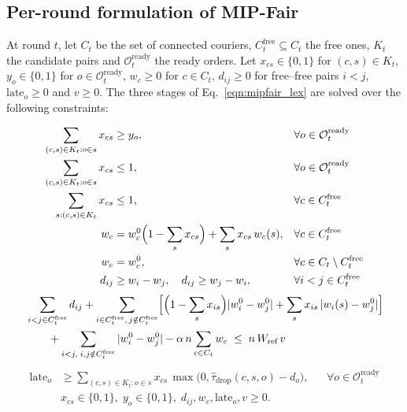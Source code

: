 \documentclass[a4paper,11pt,review,3p,authoryear]{elsarticle}
\begin{document}
\subsection{Per-round formulation of MIP-Fair}
\label{sec:app_MIP}

At round $t$, let $C_t$ be the set of connected couriers, $C_t^{\text{free}} \subseteq C_t$ the free ones, $K_t$ the candidate pairs and $\mathcal{O}_t^{\text{ready}}$ the ready orders. Let $x_{cs} \in \{0,1\}$ for $(c,s) \in K_t$, $y_o \in \{0,1\}$ for $o \in \mathcal{O}_t^{\text{ready}}$, $w_c \ge 0$ for $c \in C_t$, $d_{ij} \ge 0$ for free--free pairs $i < j$, $\text{late}_o \ge 0$ and $v \ge 0$. The three stages of Eq.~\eqref{eqn:mipfair_lex} are solved over the following constraints:

\begin{align}
\sum_{(c,s) \in K_t : o \in s} x_{cs} & \ge y_o, && \forall o \in \mathcal{O}_t^{\text{ready}} \label{eqn:app_cover} \\
\sum_{(c,s) \in K_t : o \in s} x_{cs} & \le 1, && \forall o \in \mathcal{O}_t^{\text{ready}} \label{eqn:app_once} \\
\sum_{s : (c,s) \in K_t} x_{cs} & \le 1, && \forall c \in C_t^{\text{free}} \label{eqn:app_courier} \\
w_c & = w_c^0 \Bigl(1 - \sum_{s} x_{cs}\Bigr) + \sum_{s} x_{cs}\, w_c(s), && \forall c \in C_t^{\text{free}} \label{eqn:app_w} \\
w_c & = w_c^0, && \forall c \in C_t \setminus C_t^{\text{free}} \label{eqn:app_wfixed} \\
d_{ij} & \ge w_i - w_j, \quad d_{ij} \ge w_j - w_i, && \forall i < j \in C_t^{\text{free}} \label{eqn:app_d}
\end{align}
\begin{equation}
\begin{split}
& \sum_{i<j \in C_t^{\text{free}}} d_{ij} + \sum_{i \in C_t^{\text{free}},\, j \notin C_t^{\text{free}}} \Bigl[\Bigl(1 - \sum_s x_{is}\Bigr)|w_i^0 - w_j^0| + \sum_s x_{is}\, |w_i(s) - w_j^0|\Bigr] \\
& \qquad + \sum_{i<j,\; i,j \notin C_t^{\text{free}}} |w_i^0 - w_j^0| - \alpha\, n \sum_{c \in C_t} w_c \;\le\; n\, W_{\text{ref}}\, v
\end{split}
\label{eqn:app_gini}
\end{equation}
\begin{align}
\text{late}_o & \ge \sum_{(c,s) \in K_t : o \in s} x_{cs}\, \max\bigl(0, \hat\tau_{\text{drop}}(c, s, o) - d_o\bigr), && \forall o \in \mathcal{O}_t^{\text{ready}} \label{eqn:app_late} \\
& x_{cs} \in \{0,1\},\; y_o \in \{0,1\},\; d_{ij}, w_c, \text{late}_o, v \ge 0. && \label{eqn:app_dom}
\end{align}
\end{document}
